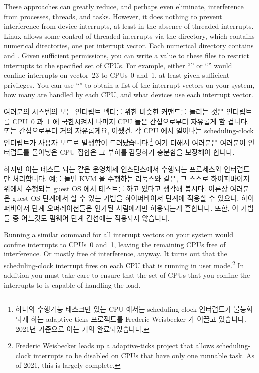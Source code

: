 These approaches can greatly reduce, and perhaps even eliminate,
interference from processes, threads, and tasks.
However, it does nothing to prevent interference from device
interrupts, at least in the absence of threaded interrupts.
Linux allows some control of threaded interrupts via the
 directory, which contains numerical directories, one
per interrupt vector.
Each numerical directory contains  and
.
Given sufficient permissions, you can write a value to these files
to restrict interrupts to the specified set of CPUs.
For example, either
``''
or
``''
would confine interrupts on vector~23 to CPUs~0 and~1,
at least given sufficient privileges.
You can use ``'' to obtain a list of the interrupt
vectors on your system, how many are handled by each CPU, and what
devices use each interrupt vector.

\fi

여러분의 시스템의 모든 인터럽트 벡터를 위한 비슷한 커맨드를 돌리는 것은
인터럽트를 CPU~0 과~1 에 국한시켜서 나머지 CPU 들은 간섭으로부터 자유롭게 할
겁니다.
또는 간섭으로부터 거의 자유롭게요, 어쨌건.
각 CPU 에서 일어나는 scheduling-clock 인터럽트가 사용자 모드로 발생함이
드러났습니다.\footnote{
	하나의 수행가능 태스크만 있는 CPU 에서는 scheduling-clock 인터럽트가 
	불능화 되게 하는  adaptive-ticks 프로젝트를 Frederic
	Weisbecker 가 이끌고 있습니다.
	2021년 기준으로 이는 거의 완료되었습니다.}
여기 더해서 여러분은 여러분이 인터럽트를 몰아넣은 CPU 집합은 그 부하를 감당하기
충분함을 보장해야 합니다.

하지만 이는 테스트 되는 같은 운영체제 인스턴스에서 수행되는 프로세스와
인터럽트만 처리합니다.
예를 들면 KVM 을 수행하는 리눅스와 같은, 그 스스로 하이퍼바이저 위에서 수행되는
guest OS 에서 테스트를 하고 있다고 생각해 봅시다.
이론상 여러분은 guest OS 단계에서 할 수 있는 기법을 하이퍼바이저 단계에 적용할
수 있으나, 하이퍼바이저 단계 오퍼레이션들은 인가된 사람에게만 허용되는게
흔합니다.
또한, 이 기법들 중 어느것도 펌웨어 단계 간섭에는 적용되지 않습니다.

\iffalse

Running a similar command for all interrupt vectors on your system
would confine interrupts to CPUs~0 and~1, leaving the remaining CPUs
free of interference.
Or mostly free of interference, anyway.
It turns out that the scheduling-clock interrupt fires on each CPU
that is running in user mode.\footnote{
	Frederic Weisbecker leads up a 
	adaptive-ticks project
	that allows scheduling-clock interrupts to be disabled
	on CPUs that have only one runnable task.
	As of 2021, this is largely complete.}
In addition you must take care to ensure that the set of CPUs that you
confine the interrupts to is capable of handling the load.

